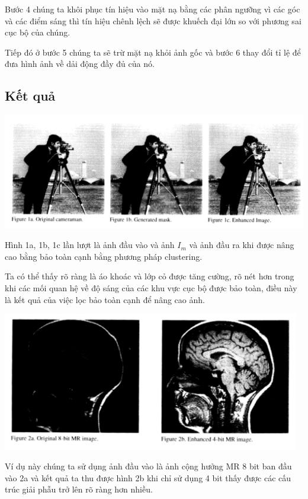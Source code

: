 \documentclass[12pt,letterpaper]{report}
\begin{document}
Bước 4 chúng ta khôi phục tín hiệu vào mặt nạ bằng các phân ngưỡng vì các góc và các điểm sáng thì tín hiệu chênh lệch sẽ được khuếch đại lớn so với phương sai cục bộ của chúng.

Tiếp đó ở bước 5 chúng ta sẽ trừ mặt nạ khỏi ảnh gốc và bước 6 thay đổi tỉ lệ để đưa hình ảnh về dải động đầy đủ của nó.

\subsection{Kết quả}

\begin{center}
	\includegraphics[width=15cm]{image5.jpg}
\end{center}

Hình 1a, 1b, 1c lần lượt là ảnh đầu vào và ảnh $I_m$ và ảnh đầu ra khi được nâng cao bằng bảo toàn cạnh bằng phương pháp clustering.

Ta có thể thấy rõ ràng là áo khoác và lớp cỏ được tăng cường, rõ nét hơn trong khi các mối quan hệ về độ sáng của các khu vực cục bộ được bảo toàn, điều này là kết quả của việc lọc bảo toàn cạnh để nâng cao ảnh.

\begin{center}
	\includegraphics[width=13cm]{image6.jpg}
\end{center}

Ví dụ này chúng ta sử dụng ảnh đầu vào là ảnh cộng hưởng MR 8 bit ban đầu vào 2a và kết quả ta thu được hình 2b khi chỉ sử dụng 4 bit thấy được các cấu trúc giải phẫu trở lên rõ ràng hơn nhiều.
\end{document}
